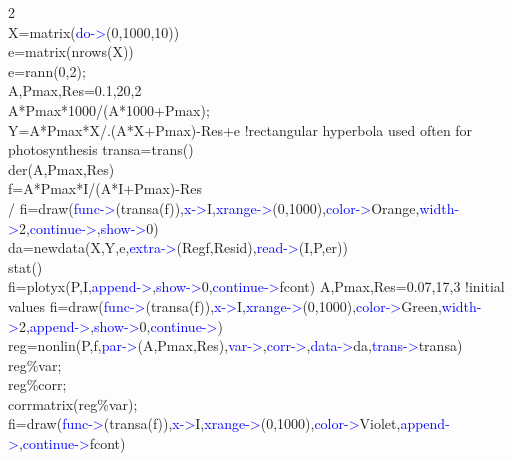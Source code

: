 \begin{example}[derex2]2\\
\label{derex2}
X=\textcolor{VioletRed}{matrix}(\textcolor{blue}{do->}(0,1000,10))\\
e=\textcolor{VioletRed}{matrix}(\textcolor{VioletRed}{nrows}(X))\\
e=\textcolor{VioletRed}{rann}(0,2);\\
A,Pmax,Res=0.1,20,2\\
A*Pmax*1000/(A*1000+Pmax);\\
Y=A*Pmax*X/.(A*X+Pmax)-Res+e  !rectangular hyperbola used often for photosynthesis
transa=\textcolor{VioletRed}{trans}()\\
\textcolor{VioletRed}{der}(A,Pmax,Res)\\
f=A*Pmax*I/(A*I+Pmax)-Res\\
/
fi=\textcolor{VioletRed}{draw}(\textcolor{blue}{func->}(transa(f)),\textcolor{blue}{x->}I,\textcolor{blue}{xrange->}(0,1000),\textcolor{blue}{color->}Orange,\textcolor{blue}{width->}2,\textcolor{blue}{continue->},\textcolor{blue}{show->}0)\\
da=\textcolor{VioletRed}{newdata}(X,Y,e,\textcolor{blue}{extra->}(Regf,Resid),\textcolor{blue}{read->}(I,P,er))\\
\textcolor{VioletRed}{stat}()\\
fi=\textcolor{VioletRed}{plotyx}(P,I,\textcolor{blue}{append->},\textcolor{blue}{show->}0,\textcolor{blue}{continue->}fcont)
A,Pmax,Res=0.07,17,3 !initial values
fi=\textcolor{VioletRed}{draw}(\textcolor{blue}{func->}(transa(f)),\textcolor{blue}{x->}I,\textcolor{blue}{xrange->}(0,1000),\textcolor{blue}{color->}Green,\textcolor{blue}{width->}2,\textcolor{blue}{append->},\textcolor{blue}{show->}0,\textcolor{blue}{continue->})\\
reg=\textcolor{VioletRed}{nonlin}(P,f,\textcolor{blue}{par->}(A,Pmax,Res),\textcolor{blue}{var->},\textcolor{blue}{corr->},\textcolor{blue}{data->}da,\textcolor{blue}{trans->}transa)\\
reg\%var;\\
reg\%corr;\\
\textcolor{VioletRed}{corrmatrix}(reg\%var);\\
fi=\textcolor{VioletRed}{draw}(\textcolor{blue}{func->}(transa(f)),\textcolor{blue}{x->}I,\textcolor{blue}{xrange->}(0,1000),\textcolor{blue}{color->}Violet,\textcolor{blue}{append->},\textcolor{blue}{continue->}fcont)
\end{example}
